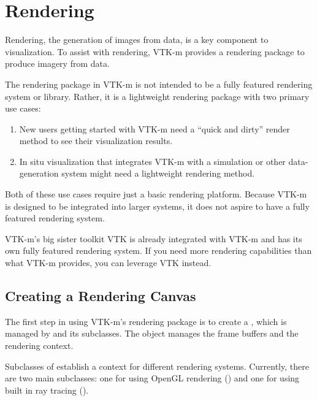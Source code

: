 
\chapter{Rendering}
\label{chap:Rendering}


Rendering, the generation of images from data, is a key component to
visualization. To assist with rendering, VTK-m provides a rendering package
to produce imagery from data.

The rendering package in VTK-m is not intended to be a fully featured
rendering system or library. Rather, it is a lightweight rendering package
with two primary use cases:
\begin{enumerate}
\item New users getting started with VTK-m need a ``quick and dirty''
  render method to see their visualization results.
\item In situ visualization that integrates VTK-m with a simulation or
  other data-generation system might need a lightweight rendering method.
\end{enumerate}

Both of these use cases require just a basic rendering platform. Because
VTK-m is designed to be integrated into larger systems, it does not aspire
to have a fully featured rendering system.

\begin{didyouknow}
  VTK-m's big sister toolkit VTK is already integrated with VTK-m and has
  its own fully featured rendering system. If you need more rendering
  capabilities than what VTK-m provides, you can leverage VTK instead.
\end{didyouknow}

\section{Creating a Rendering Canvas}


The first step in using VTK-m's rendering package is to create a
, which is managed by  and its
subclasses. The  object manages the frame buffers
and the rendering context.

Subclasses of  establish a context for different
rendering systems. Currently, there are two main subclasses: one for using
OpenGL rendering () and one for using built in
ray tracing ().

